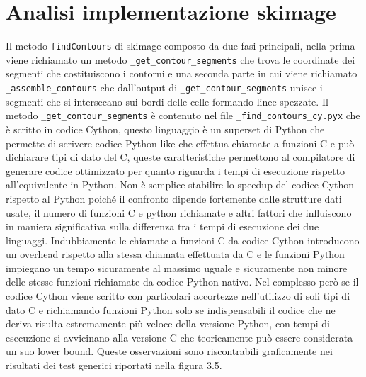 \documentclass[12pt,a4paper]{report}
\begin{document}
\section{Analisi implementazione skimage}
Il metodo \verb|findContours| di skimage composto da due fasi principali, nella prima viene richiamato un metodo \verb|_get_contour_segments| che trova le coordinate dei segmenti che costituiscono i contorni e una seconda parte in cui viene richiamato \verb|_assemble_contours| che dall'output di \verb|_get_contour_segments| unisce i segmenti che si intersecano sui bordi delle celle formando linee spezzate. \newline
Il metodo \verb|_get_contour_segments| è contenuto nel file \verb|_find_contours_cy.pyx| che è scritto in codice Cython, questo linguaggio è un superset di Python che permette di scrivere codice Python-like che effettua chiamate a funzioni C e può dichiarare tipi di dato del C, queste caratteristiche permettono al compilatore di generare codice ottimizzato per quanto riguarda i tempi di esecuzione rispetto all'equivalente in Python. \newline
Non è semplice stabilire lo speedup del codice Cython rispetto al Python poiché il confronto dipende fortemente dalle strutture dati usate, il numero di funzioni C e python richiamate e altri fattori che influiscono in maniera significativa sulla differenza tra i tempi di esecuzione dei due linguaggi. Indubbiamente le chiamate a funzioni C da codice Cython introducono un overhead rispetto alla stessa chiamata effettuata da C e le funzioni Python impiegano un tempo sicuramente al massimo uguale e sicuramente non minore delle stesse funzioni richiamate da codice Python nativo. \newline
Nel complesso però se il codice Cython viene scritto con particolari accortezze nell'utilizzo di soli tipi di dato C e richiamando funzioni Python solo se indispensabili il codice che ne deriva risulta estremamente più veloce della versione Python, con tempi di esecuzione si avvicinano alla versione C che teoricamente può essere considerata un suo lower bound. Queste osservazioni sono riscontrabili graficamente nei risultati dei test generici riportati nella figura 3.5. 
\end{document}
